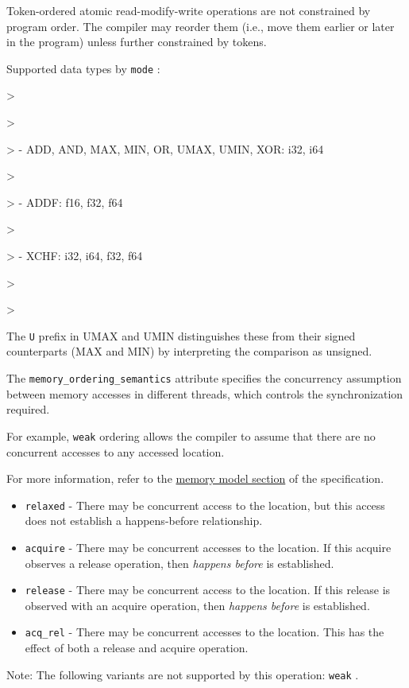 \documentclass{article}
\begin{document}
Token-ordered atomic read-modify-write operations are not constrained by program order. The compiler may reorder them (i.e., move them earlier or later in the program) unless further constrained by tokens.


Supported data types by \texttt{mode} :


> 

> 

> - ADD, AND, MAX, MIN, OR, UMAX, UMIN, XOR: i32, i64

> 

> - ADDF: f16, f32, f64

> 

> - XCHF: i32, i64, f32, f64

> 

> 


The \texttt{U} prefix in UMAX and UMIN distinguishes these from their signed counterparts (MAX and MIN) by interpreting the comparison as unsigned.


The \texttt{memory\_ordering\_semantics} attribute specifies the concurrency assumption between memory accesses in different threads, which controls the synchronization required.

For example, \texttt{weak} ordering allows the compiler to assume that there are no concurrent accesses to any accessed location.

For more information, refer to the \href{https://docs.nvidia.com/cuda/tile-ir/latest/sections/memory_model.html#section-memory-model}{memory model section} of the specification.


\begin{itemize}
\item \texttt{relaxed} - There may be concurrent access to the location, but this access does not establish a happens-before relationship.
\item \texttt{acquire} -  There may be concurrent accesses to the location. If this acquire observes a release operation, then \textit{happens before} is established.
\item \texttt{release} - There may be concurrent access to the location. If this release is observed with an acquire operation, then \textit{happens before} is established.
\item \texttt{acq\_rel} - There may be concurrent accesses to the location. This has the effect of both a release and acquire operation.

\end{itemize}
Note: The following variants are not supported by this operation: \texttt{weak} .
\end{document}

